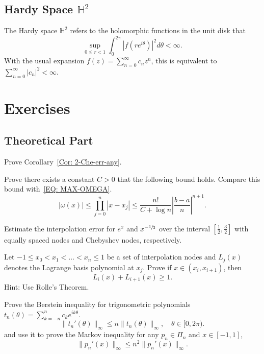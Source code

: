 \subsection{Hardy Space \texorpdfstring{${\mathbb{H}}^2$}{}}
\label{SSec: 2-Har-Spa}
The Hardy space $\mathbb{H}^2$ refers to the holomorphic functions in the unit disk that 
\begin{equation}
    \sup_{0\le r <  1} \int_0^{2\pi} |f(r e^{i\theta})|^2 d\theta < \infty.
\end{equation}
With the usual expansion $f(z) = \sum_{n=0}^{\infty} c_n z^n$, this is equivalent to $\sum_{n=0}^{\infty} |c_n|^2 < \infty$. 
\section{Exercises}
\subsection{Theoretical Part}
\begin{problem}
    Prove Corollary~\ref{Cor: 2-Che-err-any}.
\end{problem}
\begin{problem}
    Prove there exists a constant $C > 0$ that the following bound holds. Compare this bound with~\eqref{EQ: MAX-OMEGA}.
    \begin{equation}
        |\omega(x)|\le \prod_{j=0}^n |x - x_j| \le \frac{n!}{C + \log n} \left|\frac{b-a}{n}\right|^{n+1}.
    \end{equation}
\end{problem}
\begin{problem}
\label{Prb: 2-Theo-2}
    Estimate the interpolation error for $e^x$ and $x^{-\sfrac{1}{2}}$ over the interval $[\frac{1}{2}, \frac{3}{2}]$ with equally spaced nodes and Chebyshev nodes, respectively.
\end{problem}
\begin{problem}
    Let $-1\le x_0 < x_1 <\dots < x_n \le 1$ be a set of interpolation nodes and $L_j(x)$ denotes the Lagrange basis polynomial at $x_j$. Prove if $x\in (x_i, x_{i+1})$, then 
    $$L_{i}(x) + L_{i+1}(x) \ge 1.$$
    Hint: Use Rolle's Theorem.
\end{problem}
\begin{problem}
    Prove the Berstein inequality  for trigonometric polynomials $t_n(\theta) = \sum_{k=-n}^n c_k e^{ik\theta}$.
    \begin{equation}\nonumber
        \|t_n'(\theta)\|_{\infty} \le n \|t_n(\theta)\|_{\infty},\quad \theta\in [0, 2\pi).
    \end{equation}
    and use it to prove the Markov inequality for any $p_n\in\Pi_n$ and $x\in [-1,1]$, 
    \begin{equation*}
        \|p_n'(x)\|_{\infty}\le n^2 \|p_n'(x)\|_{\infty}.
    \end{equation*}
\end{problem}
